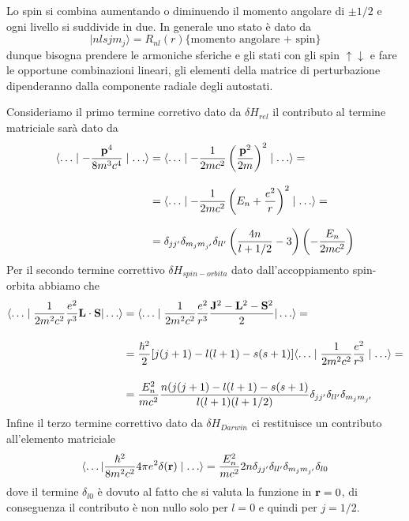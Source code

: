 Lo spin si combina aumentando o diminuendo il momento angolare di $\pm 1/2$ e ogni livello si suddivide in due. In generale uno stato \`e dato da 
\begin{equation*}
	|nlsjm_j \rangle = R_{nl}(r) \{\text{momento angolare + spin}\}
\end{equation*}
dunque bisogna prendere le armoniche sferiche e gli stati con gli spin $\uparrow \downarrow$ e fare le opportune combinazioni lineari, gli elementi della matrice di perturbazione dipenderanno dalla componente radiale degli autostati.

Consideriamo il primo termine corretivo dato da $\delta H_{rel}$ il contributo al termine matriciale sar\`a dato da 
\begin{align*}
	\langle \ldots \mid - \frac{\bold{p}^4}{8m^3c^4}\mid \ldots \rangle & = \langle \ldots \mid -\frac{1}{2mc^2}\left( \frac{\bold{p}^2}{2m}\right)^2 \mid \ldots \rangle  = \\[0.3cm]
	& = \langle \ldots \mid - \frac{1}{2mc^2} \left ( E_n + \frac{e^2}{r}\right)^2 \mid \ldots \rangle = \\[0.3cm]
	& = \delta_{jj'}\delta_{m_jm_{j'}}\delta_{ll'} \left( \frac{4n}{l + 1/2} -3\right)\left( - \frac{E_n}{2mc^2}\right)
\end{align*}
Per il secondo termine correttivo $\delta H_{spin-orbita}$ dato dall'accoppiamento spin-orbita abbiamo che 
\begin{align*}
	\langle \ldots \mid \frac{1}{2m^2c^2}\frac{e^2}{r^3} \bold{L} \cdot \bold{S}|\ldots \rangle & = \langle \ldots \mid \frac{1}{2m^2c^2}\frac{e^2}{r^3} \frac{\bold{J}^2 - \bold{L}^2 - \bold{S}^2}{2} |\ldots \rangle = \\[0.4cm]
	& = \frac{\hbar^2}{2}[j(j+1)-l(l+1)-s(s+1)]\langle \ldots \mid \frac{1}{2m^2c^2}\frac{e^2}{r^3} \mid \ldots \rangle = \\[0.4cm]
	& = \frac{E_n^2}{mc^2} \frac{n(j(j+1)-l(l+1)-s(s+1)}{l(l+1)(l+1/2)}\delta_{jj'}\delta_{ll'}\delta_{m_j m_{j'}}
\end{align*}
Infine il terzo termine correttivo dato da $\delta H_{Darwin}$ ci restituisce un contributo all'elemento matriciale 
\begin{equation*}
	\langle \ldots | \frac{\hbar^2}{8 m^2 c^2}4 \pi e^2 \delta(\bold{r}) \mid \ldots \rangle = \frac{E_n^2}{mc^2}2n \delta_{jj'}\delta_{ll'}\delta_{m_j m_{j'}} \delta_{l0} 
\end{equation*}
dove il termine $\delta_{l0}$ \`e dovuto al fatto che si valuta la funzione in $\bold{r} = 0$, di conseguenza il contributo \`e non nullo solo per $l=0$ e quindi per $j = 1/2$.


